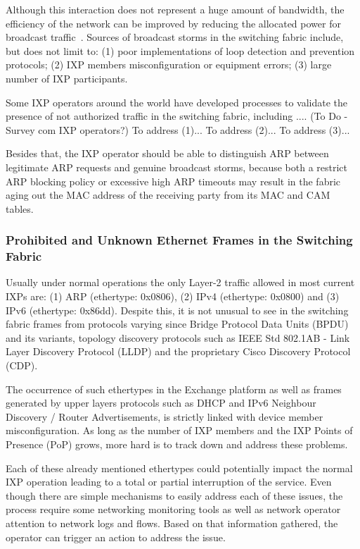 \documentclass[conference]{IEEEtran/IEEEtran}
\begin{document}
Although this interaction does not represent a huge amount of bandwidth, the efficiency of the network can be improved by reducing the allocated power for broadcast traffic~\cite{ams2013victor}. Sources of broadcast storms in the switching fabric include, but does not limit to: (1) poor implementations of loop detection and prevention protocols; (2) IXP members misconfiguration or equipment errors; (3) large number of IXP participants. 

Some IXP operators around the world have developed processes to validate the presence of not authorized traffic in the switching fabric, including .... (To Do - Survey com IXP operators?)
To address (1)...
To address (2)...
To address (3)...

Besides that, the IXP operator should be able to distinguish ARP between legitimate ARP requests and genuine broadcast storms, because both a restrict ARP blocking policy or excessive high ARP timeouts may result in the fabric aging out the MAC address of the receiving party from its MAC and CAM tables.

\subsubsection{Prohibited and Unknown Ethernet Frames in the Switching Fabric}
Usually under normal operations the only Layer-2 traffic allowed in most current IXPs are: (1) ARP (ethertype: 0x0806), (2) IPv4 (ethertype: 0x0800) and (3) IPv6 (ethertype: 0x86dd). Despite this, it is not unusual to see in the switching fabric frames from protocols varying since Bridge Protocol Data Units (BPDU) and its variants, topology discovery protocols such as IEEE Std 802.1AB - Link Layer Discovery Protocol (LLDP) and the proprietary Cisco Discovery Protocol (CDP). 

The occurrence of such ethertypes in the Exchange platform as well as frames generated by upper layers protocols such as DHCP and IPv6 Neighbour Discovery / Router Advertisements, is strictly linked with device member misconfiguration. As long as the number of IXP members and the IXP Points of Presence (PoP) grows, more hard is to track down and address these problems. 

Each of these already mentioned ethertypes could potentially impact the normal IXP operation leading to a total or partial interruption of the service. Even though there are simple mechanisms to easily address each of these issues, the process require some networking monitoring tools as well as network operator attention to network logs and flows. Based on that information gathered, the operator can trigger an action to address the issue. 
\end{document}
